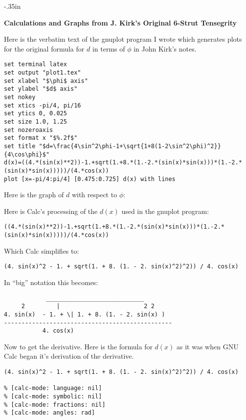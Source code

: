 \topmargin -.35in\evensidemargin -0.5in\oddsidemargin -0.5in\headheight 0in\headsep 0in
\setlength{\textwidth}{7.25in}\setlength{\textheight}{10.35in}

\begin{center} \Large\bf
Calculations and Graphs from J. Kirk's Original 6-Strut Tensegrity
\end{center}

Here is the verbatim text of the gnuplot program I wrote which generates
plots for the original formula for $d$ in terms of $\phi$ in John Kirk's
notes.

\begin{verbatim}
set terminal latex
set output "plot1.tex"
set xlabel "$\phi$ axis"
set ylabel "$d$ axis"
set nokey
set xtics -pi/4, pi/16
set ytics 0, 0.025
set size 1.0, 1.25
set nozeroaxis
set format x "$%.2f$"
set title "$d=\frac{4\sin^2\phi-1+\sqrt{1+8(1-2\sin^2\phi)^2}}{4\cos\phi}$"
d(x)=((4.*(sin(x)**2))-1.+sqrt(1.+8.*(1.-2.*(sin(x)*sin(x)))*(1.-2.*(sin(x)*sin(x)))))/(4.*cos(x))
plot [x=-pi/4:pi/4] [0.475:0.725] d(x) with lines
\end{verbatim}
Here is the graph of $d$ with respect to $\phi$:
	\begin{center}
		
	\end{center}

Here is Calc's processing of the $d(x)$ used in the gnuplot program:
\begin{verbatim}
((4.*(sin(x)**2))-1.+sqrt(1.+8.*(1.-2.*(sin(x)*sin(x)))*(1.-2.*(sin(x)*sin(x)))))/(4.*cos(x))
\end{verbatim}

Which Calc simplifies to:
\begin{verbatim}
(4. sin(x)^2 - 1. + sqrt(1. + 8. (1. - 2. sin(x)^2)^2)) / 4. cos(x)
\end{verbatim}
\newpage
In ``big'' notation this becomes:
\begin{verbatim}
		    ____________________________
	 2         |                        2 2
4. sin(x)  - 1. + \| 1. + 8. (1. - 2. sin(x) )
------------------------------------------------
		   4. cos(x)
\end{verbatim}

Now to get the derivative.  Here is the formula for $d(x)$ as it was
when GNU Calc began it's derivation of the derivative.
\begin{verbatim}
(4. sin(x)^2 - 1. + sqrt(1. + 8. (1. - 2. sin(x)^2)^2)) / 4. cos(x)

% [calc-mode: language: nil]
% [calc-mode: symbolic: nil]
% [calc-mode: fractions: nil]
% [calc-mode: angles: rad]
\end{verbatim}

